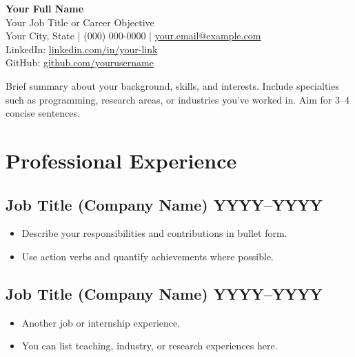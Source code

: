 \documentclass[a4paper,9pt]{article}
\begin{document}
\begin{center}
    {\large \textbf{Your Full Name}} \\
    \vspace{1mm}
    {\large Your Job Title or Career Objective} \\
    {\large Your City, State | (000) 000-0000 | \href{mailto:your.email@example.com}{your.email@example.com}} \\
    {\large LinkedIn: \href{https://linkedin.com/in/your-link}{linkedin.com/in/your-link}} \\
    {\large GitHub: \href{https://github.com/yourusername}{github.com/yourusername}}
\end{center}

\vspace{2mm}
\sloppy

\noindent
Brief summary about your background, skills, and interests. Include specialties such as programming, research areas, or industries you’ve worked in. Aim for 3–4 concise sentences.

\begin{sloppypar}
\end{sloppypar}

\section*{Professional Experience}

\subsection*{Job Title (Company Name) \hfill YYYY–YYYY}
\begin{itemize}[leftmargin=0.15in]
    \item Describe your responsibilities and contributions in bullet form.
    \item Use action verbs and quantify achievements where possible.
\end{itemize}

\subsection*{Job Title (Company Name) \hfill YYYY–YYYY}
\begin{itemize}[leftmargin=0.15in]
    \item Another job or internship experience.
    \item You can list teaching, industry, or research experiences here.
\end{itemize}
\end{document}
